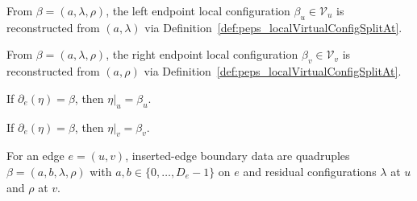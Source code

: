 \begin{definition}%
    \label{def:peps_edgeLeftLocalConfig}
    \leanok
    From $\beta=(a,\lambda,\rho)$, the left endpoint local configuration
    $\beta_u\in\mathcal V_u$ is reconstructed from $(a,\lambda)$ via
    Definition~\ref{def:peps_localVirtualConfigSplitAt}.
\end{definition}

\begin{definition}%
    \label{def:peps_edgeRightLocalConfig}
    \leanok
    From $\beta=(a,\lambda,\rho)$, the right endpoint local configuration
    $\beta_v\in\mathcal V_v$ is reconstructed from $(a,\rho)$ via
    Definition~\ref{def:peps_localVirtualConfigSplitAt}.
\end{definition}

\begin{lemma}%
    \label{thm:peps_edgeLeftLocalConfig_eq_of_boundaryMatches}
    \leanok
    If $\partial_e(\eta)=\beta$, then $\eta|_u=\beta_u$.
\end{lemma}

\begin{lemma}%
    \label{thm:peps_edgeRightLocalConfig_eq_of_boundaryMatches}
    \leanok
    If $\partial_e(\eta)=\beta$, then $\eta|_v=\beta_v$.
\end{lemma}

\begin{definition}%
    \label{def:peps_edgeInsertedBoundaryConfig}
    \leanok
    For an edge $e=(u,v)$, inserted-edge boundary data are quadruples
    $\beta=(a,b,\lambda,\rho)$ with $a,b\in\{0,\ldots,D_e-1\}$ on $e$ and
    residual configurations $\lambda$ at $u$ and $\rho$ at $v$.
\end{definition}

